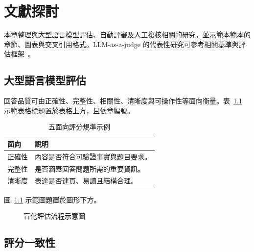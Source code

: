 \chapter{文獻探討}

本章整理與大型語言模型評估、自動評審及人工複核相關的研究，並示範本範本的章節、圖表與交叉引用格式。LLM-as-a-judge 的代表性研究可參考相關基準與評估框架~\autocite{zheng2023judging,dubois2024alpacafarm}。

\section{大型語言模型評估}

回答品質可由正確性、完整性、相關性、清晰度與可操作性等面向衡量。表~\ref{tab:rubric} 示範表格標題置於表格上方，且依章編號。

\begin{table}[H]
  \caption{五面向評分規準示例}
  \label{tab:rubric}
  \centering
  \begin{tabularx}{\textwidth}{>{\centering\arraybackslash}p{} X}
    \toprule
    面向 & 說明 \\
    \midrule
    正確性 & 內容是否符合可驗證事實與題目要求。 \\
    完整性 & 是否涵蓋回答問題所需的重要資訊。 \\
    清晰度 & 表達是否連貫、易讀且結構合理。 \\
    \bottomrule
  \end{tabularx}
\end{table}

圖~\ref{fig:workflow} 示範圖題置於圖形下方。

\begin{figure}[H]
  \centering
  \caption{盲化評估流程示意圖}
  \label{fig:workflow}
\end{figure}

\section{評分一致性}

